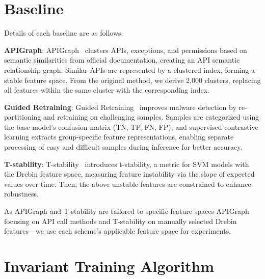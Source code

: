 \section{Baseline}
\label{baseline}
Details of each baseline are as follows:

\textbf{APIGraph}: APIGraph~\cite{apigraph} clusters APIs, exceptions, and permissions based on semantic similarities from official documentation, creating an API semantic relationship graph. Similar APIs are represented by a clustered index, forming a stable feature space. From the original method, we derive 2,000 clusters, replacing all features within the same cluster with the corresponding index. 

\textbf{Guided Retraining}: Guided Retraining~\cite{guide_retraining} improves malware detection by re-partitioning and retraining on challenging samples. Samples are categorized using the base model’s confusion matrix (TN, TP, FN, FP), and supervised contrastive learning extracts group-specific feature representations, enabling separate processing of easy and difficult samples during inference for better accuracy.

\textbf{T-stability}: T-stability~\cite{svm_ce} introduces t-stability, a metric for SVM models with the Drebin feature space, measuring feature instability via the slope of expected values over time. Then, the above unstable features are constrained to enhance robustness.

As APIGraph and T-stability are tailored to specific feature spaces-APIGraph focusing on API call methods and T-stability on manually selected Drebin~\cite{Arpdrebin} features—we use each scheme’s applicable feature space for experiments.



\section{Invariant Training Algorithm}
\label{inv_alg}


